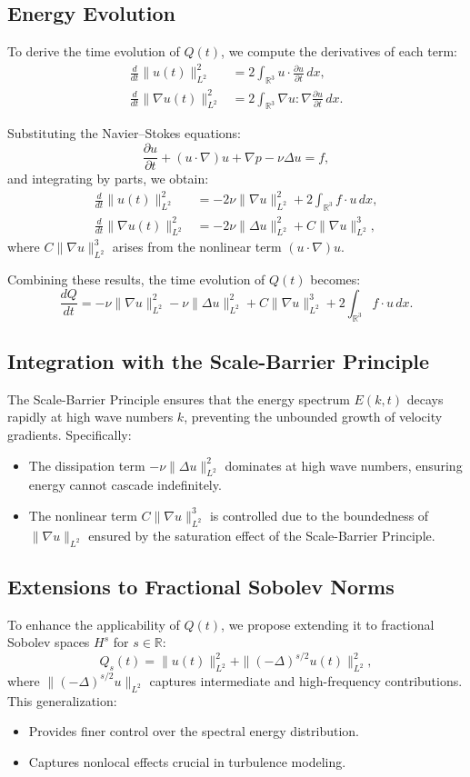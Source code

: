 \subsection{Energy Evolution}
To derive the time evolution of $Q(t)$, we compute the derivatives of each term:
\begin{align*}
\frac{d}{dt} \|u(t)\|_{L^2}^2 &= 2 \int_{\mathbb{R}^3} u \cdot \frac{\partial u}{\partial t} \, dx, \\
\frac{d}{dt} \|\nabla u(t)\|_{L^2}^2 &= 2 \int_{\mathbb{R}^3} \nabla u : \nabla \frac{\partial u}{\partial t} \, dx.
\end{align*}

Substituting the Navier--Stokes equations:
\[
\frac{\partial u}{\partial t} + (u \cdot \nabla)u + \nabla p - \nu \Delta u = f,
\]
and integrating by parts, we obtain:
\begin{align*}
\frac{d}{dt} \|u(t)\|_{L^2}^2 &= -2\nu \|\nabla u\|_{L^2}^2 + 2 \int_{\mathbb{R}^3} f \cdot u \, dx, \\
\frac{d}{dt} \|\nabla u(t)\|_{L^2}^2 &= -2\nu \|\Delta u\|_{L^2}^2 + C \|\nabla u\|_{L^2}^3,
\end{align*}
where $C \|\nabla u\|_{L^2}^3$ arises from the nonlinear term $(u \cdot \nabla)u$.

Combining these results, the time evolution of $Q(t)$ becomes:
\[
\frac{dQ}{dt} = -\nu \|\nabla u\|_{L^2}^2 - \nu \|\Delta u\|_{L^2}^2 + C \|\nabla u\|_{L^2}^3 + 2 \int_{\mathbb{R}^3} f \cdot u \, dx.
\]

\subsection{Integration with the Scale-Barrier Principle}
The Scale-Barrier Principle ensures that the energy spectrum $E(k, t)$ decays rapidly at high wave numbers $k$, preventing the unbounded growth of velocity gradients. Specifically:
\begin{itemize}
    \item The dissipation term $-\nu \|\Delta u\|_{L^2}^2$ dominates at high wave numbers, ensuring energy cannot cascade indefinitely.
    \item The nonlinear term $C \|\nabla u\|_{L^2}^3$ is controlled due to the boundedness of $\|\nabla u\|_{L^2}$ ensured by the saturation effect of the Scale-Barrier Principle.
\end{itemize}

\subsection{Extensions to Fractional Sobolev Norms}
To enhance the applicability of $Q(t)$, we propose extending it to fractional Sobolev spaces $H^s$ for $s \in \mathbb{R}$:
\[
Q_s(t) = \|u(t)\|_{L^2}^2 + \|(-\Delta)^{s/2} u(t)\|_{L^2}^2,
\]
where $\|(-\Delta)^{s/2} u\|_{L^2}$ captures intermediate and high-frequency contributions. This generalization:
\begin{itemize}
    \item Provides finer control over the spectral energy distribution.
    \item Captures nonlocal effects crucial in turbulence modeling.
\end{itemize}

